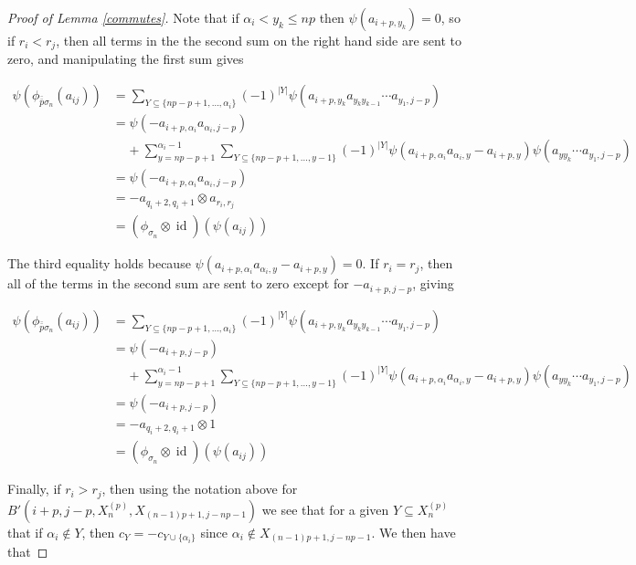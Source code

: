 \documentclass[11pt]{amsart}
\def\s{{\sigma}}
\def\a{\alpha}
\def\fp{{\scriptstyle \bar{\bar{p}}}}
\newcommand\id{\operatorname{id}}
\theoremstyle{definition}
\begin{document}
\begin{proof} [Proof of Lemma \ref{commutes}]


Note that if $\a_i < y_k \le np$ then $\psi(a_{i+p,y_k}) = 0$, so if $r_i < r_j$, then all terms in the the second sum on the right hand side are sent to zero, and manipulating the first sum gives

\begin{align*}
\psi\left(\phi_{\fp \s_n}(a_{ij})\right) &= \sum_{Y\subseteq \{np-p+1,\ldots,\a_i\}}(-1)^{|Y|}\psi(a_{i+p,y_k}a_{y_ky_{k-1}}\cdots a_{y_1,j-p})\\
&= \psi\left(- a_{i+p,\a_i}a_{\a_i,j-p}\right)\\
& \;\;\;\;+ \sum_{y=np-p+1}^{\a_i-1}\sum_{Y\subseteq \{np-p+1,\ldots,y-1\}}(-1)^{|Y|}\psi\left(a_{i+p,\a_i}a_{\a_i,y} - a_{i+p,y}\right)\psi\left(a_{yy_k}\cdots a_{y_1,j-p}\right)\\
&= \psi\left(- a_{i+p,\a_i}a_{\a_i,j-p}\right)\\
&= - a_{q_i + 2,q_i + 1}\otimes a_{r_i,r_j}\\
&= (\phi_{\s_n} \otimes \id)(\psi(a_{ij}))
\end{align*}

The third equality holds because $\psi\left(a_{i+p,\a_i}a_{\a_i,y} - a_{i+p,y}\right) = 0$.  If $r_i = r_j$, then all of the terms in the second sum are sent to zero except for $-a_{i+p,j-p}$, giving

\begin{align*}
\psi\left(\phi_{\fp \s_n}(a_{ij})\right) &= \sum_{Y\subseteq \{np-p+1,\ldots,\a_i\}}(-1)^{|Y|}\psi(a_{i+p,y_k}a_{y_ky_{k-1}}\cdots a_{y_1,j-p})\\
&= \psi\left(- a_{i+p,j-p}\right)\\
& \;\;\;\;+ \sum_{y=np-p+1}^{\a_i-1}\sum_{Y\subseteq \{np-p+1,\ldots,y-1\}}(-1)^{|Y|}\psi\left(a_{i+p,\a_i}a_{\a_i,y} - a_{i+p,y}\right)\psi\left(a_{yy_k}\cdots a_{y_1,j-p}\right)\\
&= \psi\left(- a_{i+p,j-p}\right)\\
&= - a_{q_i + 2,q_i + 1}\otimes 1\\
&= (\phi_{\s_n} \otimes \id)(\psi(a_{ij}))
\end{align*}

Finally, if $r_i > r_j$, then using the notation above for $B'(i+p,j-p,X_n^{(p)},X_{(n-1)p+1,j-np-1})$ we see that for a given $Y\subseteq X_n^{(p)}$ that if $\a_i\not\in Y$, then $c_Y = -c_{Y\cup \{\a_i\}}$ since $\a_i\not\in X_{(n-1)p+1,j-np-1}$.  We then have that


\end{proof}
\end{document}
